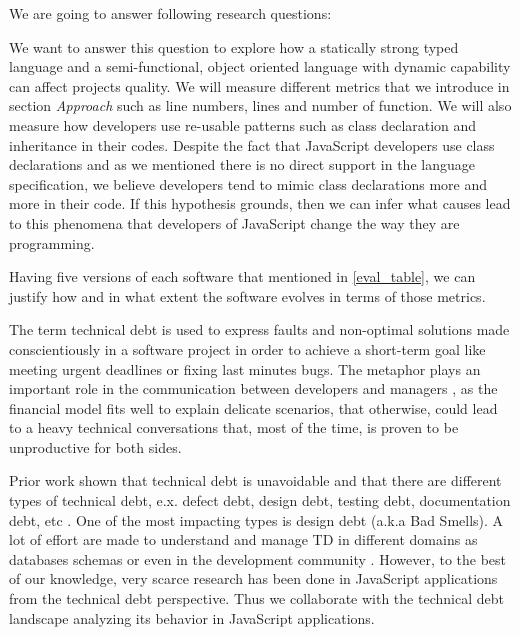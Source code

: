 
We are going to answer following research questions:

\noindent{\rqi}

We want to answer this question to explore how a statically strong typed language and a semi-functional, object oriented language with dynamic capability can affect projects quality. We will measure different metrics that we introduce in section \textit{Approach} such as line numbers, lines and number of function. We will also measure how developers use re-usable patterns such as class declaration and inheritance in their codes. Despite the fact that JavaScript developers use class declarations and as we mentioned there is no direct support in the language specification, we believe developers tend to mimic class declarations more and more in their code. If this hypothesis grounds, then we can infer what causes lead to this phenomena that developers of JavaScript change the way they are programming.
\par
{}
Having five versions of each software that mentioned in \ref{eval_table}, we can justify how and in what extent the software evolves in terms of those metrics. 

\noindent{\rqii}

		 
The term technical debt is used to express faults and non-optimal solutions made conscientiously in a software project in order to achieve a short-term goal like meeting urgent deadlines or fixing last minutes bugs. The metaphor plays an important role in the communication between developers and managers \cite{kruchten2013MTD}, as the financial model fits well to explain delicate scenarios, that otherwise, could lead to a heavy technical conversations that, most of the time, is proven to be unproductive for both sides.  
		 
Prior work shown that technical debt is unavoidable \cite{zazworka2013MTD} and that there are different types of technical debt, e.x. defect debt, design debt, testing debt, documentation debt, etc \cite{Seaman2011MMTD} . One of the most impacting types is design debt \cite{zazworka2011MTD}\cite{Fontana2012MTD} (a.k.a Bad Smells). A lot of effort are made to understand and manage TD in different domains as databases schemas \cite{Weber2014MTD} or even in the development community \cite{Tamburri2013CHASE}. However, to the best of our knowledge, very scarce research has been done in JavaScript applications from the technical debt perspective. Thus we collaborate with the technical debt landscape analyzing its behavior in JavaScript applications. 

